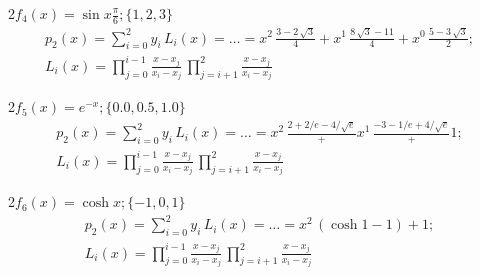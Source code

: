\documentclass["CN_A-Exercises_Resolutions.tex"]{subfiles}
\begin{document}
\begin{questionBox}2{\(f_4(x)=\sin{x\frac{\pi}{6}}; \{1,2,3\}\)} %
  \answer{}
  \begin{gather*}
    p_{2}(x)
    = \sum_{i=0}^{2}{ y_i\,L_{i}(x) }
    = \dots
    = x^2\,\frac{3-2\,\sqrt{3}}{4}
    + x^1\,\frac{8\,\sqrt{3}-11}{4}
    + x^0\,\frac{5-3\,\sqrt{3}}{2}
    ;\\
    L_{i}(x)
    =\prod_{j=0}^{i-1}{\frac{x-x_j}{x_i-x_j}}
    \,\prod_{j=i+1}^{2}{\frac{x-x_j}{x_i-x_j}}
  \end{gather*}
\end{questionBox}

\begin{questionBox}2{\(f_5(x)=e^{-x}; \{0.0,0.5,1.0\}\)} %
  \answer{}
  \begin{gather*}
    p_{2}(x)
    = \sum_{i=0}^{2}{ y_i\,L_{i}(x) }
    = \dots
    = x^2\,\frac{2+2/e-4/\sqrt{e}}
    + x^1\,\frac{-3-1/e+4/\sqrt{e}}
    + 1
    ;\\
    L_{i}(x)
    =\prod_{j=0}^{i-1}{\frac{x-x_j}{x_i-x_j}}
    \,\prod_{j=i+1}^{2}{\frac{x-x_j}{x_i-x_j}}
  \end{gather*}
\end{questionBox}

\begin{questionBox}2{\(f_6(x)=\cosh{x}; \{-1,0,1\}\)} %
  \answer{}
  \begin{gather*}
    p_{2}(x)
    = \sum_{i=0}^{2}{ y_i\,L_{i}(x) }
    = \dots
    = x^2\,(\cosh{1}-1)
    + 1
    ;\\
    L_{i}(x)
    =\prod_{j=0}^{i-1}{\frac{x-x_j}{x_i-x_j}}
    \,\prod_{j=i+1}^{2}{\frac{x-x_j}{x_i-x_j}}
  \end{gather*}
\end{questionBox}
\end{document}
